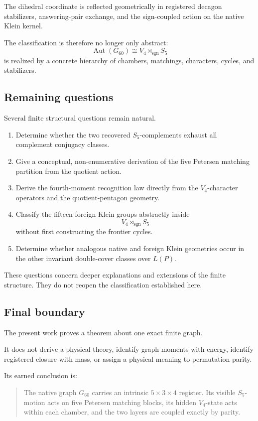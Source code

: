 The dihedral coordinate is reflected geometrically in registered
decagon stabilizers, answering-pair exchange, and the sign-coupled
action on the native Klein kernel.

The classification is therefore no longer only abstract:
\[
\boxed{
\operatorname{Aut}(G_{60})
\cong
V_4\rtimes_{\operatorname{sgn}}S_5
}
\]
is realized by a concrete hierarchy of chambers, matchings,
characters, cycles, and stabilizers.

\subsection{Remaining questions}

Several finite structural questions remain natural.

\begin{enumerate}
    \item Determine whether the two recovered \(S_5\)-complements
    exhaust all complement conjugacy classes.

    \item Give a conceptual, non-enumerative derivation of the five
    Petersen matching partition from the quotient action.

    \item Derive the fourth-moment recognition law directly from the
    \(V_4\)-character operators and the quotient-pentagon geometry.

    \item Classify the fifteen foreign Klein groups abstractly inside
    \[
    V_4\rtimes_{\operatorname{sgn}}S_5
    \]
    without first constructing the frontier cycles.

    \item Determine whether analogous native and foreign Klein
    geometries occur in the other invariant double-cover classes over
    \(L(P)\).
\end{enumerate}

These questions concern deeper explanations and extensions of the
finite structure. They do not reopen the classification established
here.

\subsection{Final boundary}

The present work proves a theorem about one exact finite graph.

It does not derive a physical theory, identify graph moments with
energy, identify registered closure with mass, or assign a physical
meaning to permutation parity.

Its earned conclusion is:

\begin{quote}
The native graph \(G_{60}\) carries an intrinsic
\(5\times3\times4\) register. Its visible \(S_5\)-motion acts on five
Petersen matching blocks, its hidden \(V_4\)-state acts within each
chamber, and the two layers are coupled exactly by parity.
\end{quote}
